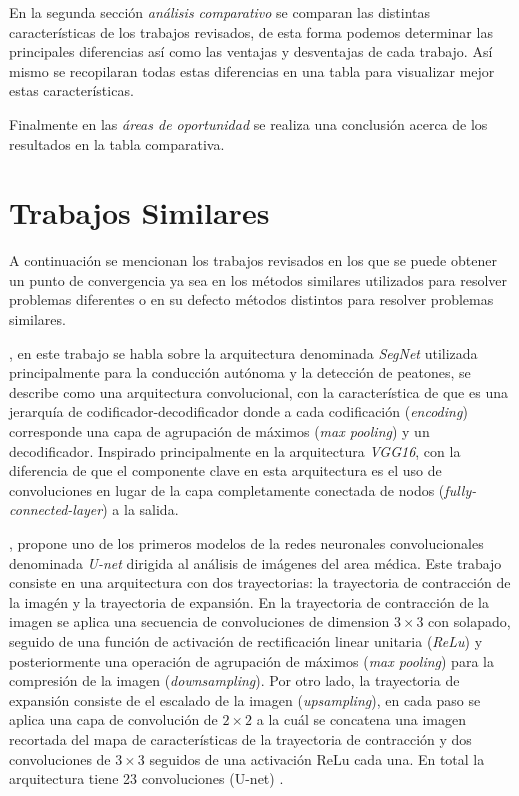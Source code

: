 En la segunda sección \emph{análisis comparativo} se comparan las distintas características de los trabajos revisados, de esta forma podemos determinar las principales diferencias así como las ventajas y desventajas de cada trabajo. Así mismo se recopilaran todas estas diferencias en una tabla para visualizar mejor estas características.

Finalmente en las \emph{áreas de oportunidad} se realiza una conclusión acerca de los resultados en la tabla comparativa.

\section{Trabajos Similares}

A continuación se mencionan los trabajos revisados en los que se puede obtener un punto de convergencia ya sea en los métodos similares utilizados para resolver problemas diferentes o en su defecto métodos distintos para resolver problemas similares.

\citet{DBLP:journals/corr/BadrinarayananK15}, en este trabajo se habla sobre la arquitectura denominada \emph{SegNet} utilizada principalmente para la conducción autónoma y la detección de peatones, se describe como una arquitectura convolucional, con la característica de que es una jerarquía de codificador-decodificador donde a cada codificación (\emph{encoding}) corresponde una capa de agrupación de máximos (\emph{max pooling}) y un decodificador. Inspirado principalmente en la arquitectura \emph{VGG16}, con la diferencia de que el componente clave en esta arquitectura es el uso de convoluciones en lugar de la capa completamente conectada de nodos (\emph{fully-connected-layer}) a la salida.

\citet{DBLP:journals/corr/RonnebergerFB15}, propone uno de los primeros modelos de la redes neuronales convolucionales denominada \emph{U-net} dirigida al análisis de imágenes del area médica. Este trabajo consiste en una arquitectura con dos trayectorias: la trayectoria de contracción de la imagén y la trayectoria de expansión. En la trayectoria de contracción de la imagen se aplica una secuencia de convoluciones de dimension $3 \times 3$ con solapado, seguido de una función de activación de rectificación linear unitaria (\emph{ReLu}) y posteriormente una operación de agrupación de máximos (\emph{max pooling}) para la compresión de la imagen (\emph{downsampling}). Por otro lado, la trayectoria de expansión consiste de el escalado de la imagen (\emph{upsampling}), en cada paso se aplica una capa de convolución de $2 \times 2$ a la cuál se concatena una imagen recortada del mapa de características de la trayectoria de contracción y dos convoluciones de $3 \times 3$ seguidos de una activación ReLu cada una. En total la arquitectura tiene 23 convoluciones (U-net) .

